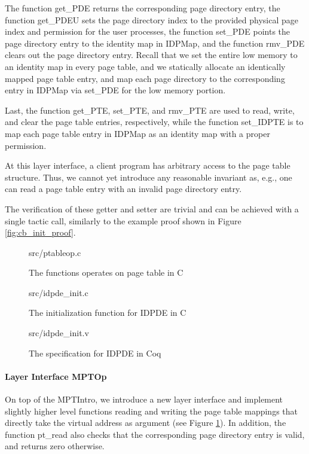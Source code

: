 The function \textsf{get\_PDE} returns the corresponding page directory entry,
the function \textsf{get\_PDEU} sets the page directory index to the
provided physical page index and permission for the user processes, 
the function \textsf{set\_PDE} points the page directory entry to the
identity map in \textsf{IDPMap}, and the function \textsf{rmv\_PDE}
clears out the page directory entry. Recall that we set the entire low memory
to an identity map in every page table, and we statically allocate an identically
mapped page table entry, and map each page directory to the corresponding
entry in \textsf{IDPMap} via \textsf{set\_PDE} for the low memory portion.

Last, the function \textsf{get\_PTE}, \textsf{set\_PTE}, and \textsf{rmv\_PTE}
are used to read, write, and clear the page table entries, respectively, while
the function \textsf{set\_IDPTE} is to map each page table entry in \textsf{IDPMap}
as an identity map with a proper permission.

At this layer interface, a client program has arbitrary access to the page table structure.
Thus, we cannot yet introduce any reasonable invariant as, e.g., one can read a page table
entry with an invalid page directory entry.

The verification of these getter and setter are trivial and can be achieved with a single tactic call,
similarly to the example proof shown in Figure \ref{fig:cb_init_proof}.


\begin{figure}
	 {src/ptableop.c}
	\caption{The functions operates on page table in C}
	\label{fig:ptable_op_c}
\end{figure}


\begin{figure}
	 {src/idpde_init.c}
	\caption{The initialization function for IDPDE in C}
	\label{fig:idpde_init_c}
\end{figure}

\begin{figure}
	 {src/idpde_init.v}
	\caption{The specification for IDPDE in Coq}
	\label{fig:idpde_init_v}
\end{figure}

\paragraph{Layer Interface MPTOp}

On top of the MPTIntro, we introduce a new layer interface and implement
slightly higher level functions reading and writing the page table mappings that directly
take the virtual address as argument (see Figure \ref{fig:ptable_op_c}).
In addition, the function \textsf{pt\_read} also checks that the corresponding page
directory entry is valid, and returns zero otherwise.

